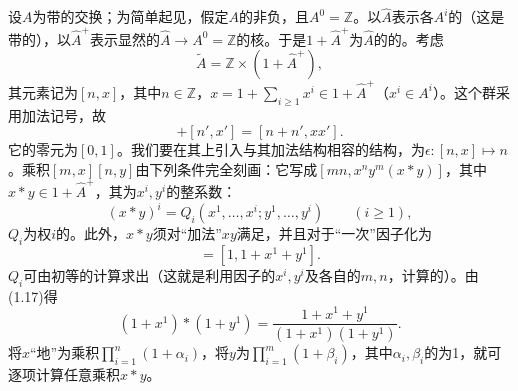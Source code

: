 设$A$为带的交换；为简单起见，假定$A$的非负，且$A^0=\mathbb Z$。以$\widehat A$表示各$A^i$的（这是带的），以$\widehat A^+$表示显然的$\widehat A\to A^0=\mathbb Z$的核。于是$1+\widehat A^+$为$\widehat A$的的。考虑
\begin{equation}\widetilde A=\mathbb Z\times(1+\widehat A^+),\tag{1.14}\end{equation}
其元素记为$[n,x]$，其中$n\in\mathbb Z$，$x=1+\sum_{i\geq1}x^i\in1+\widehat A^+$（$x^i\in A^i$）。这个群采用加法记号，故
\begin{equation}[n,x]+[n',x']=[n+n',xx'].\tag{1.15}\end{equation}
它的零元为$[0,1]$。我们要在其上引入与其加法结构相容的结构，为$\epsilon:[n,x]\mapsto n$。乘积$[m,x][n,y]$由下列条件完全刻画：它写成$[mn,x^ny^m(x*y)]$，其中$x*y\in1+\widehat A^+$，其为$x^i,y^i$的整系数：
\begin{equation}(x*y)^i=Q_i(x^1,\ldots,x^i;y^1,\ldots,y^i)\qquad(i\geq1),\tag{1.16}\end{equation}
$Q_i$为权$i$的。此外，$x*y$须对“加法”$xy$满足，并且对于“一次”因子化为
\begin{equation}[1,1+x^1][1,1+y^1]=[1,1+x^1+y^1].\tag{1.17}\end{equation}
$Q_i$可由初等的计算求出（这就是利用因子的$x^i,y^i$及各自的$m,n$，计算的）。由(1.17)得
\begin{equation}(1+x^1)*(1+y^1)=\frac{1+x^1+y^1}{(1+x^1)(1+y^1)}.\tag{1.17 bis}\end{equation}
将$x$“地”为乘积$\prod_{i=1}^n(1+\alpha_i)$，将$y$为$\prod_{i=1}^m(1+\beta_i)$，其中$\alpha_i,\beta_i$的为1，就可逐项计算任意乘积$x*y$。

